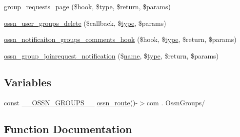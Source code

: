 \begin{DoxyCompactItemize}
\item 
\hyperlink{_ossn_groups_2ossn__com_8php_ac0c5dae50c34e8983844c5779765d01e}{group\+\_\+requests\+\_\+page} (\$hook, \$\hyperlink{_ossn_wall_2actions_2wall_2post_2group_8php_a2dc1bb4e1ed0029daa81ac0776b14b51}{type}, \$return, \$params)
\item 
\hyperlink{_ossn_groups_2ossn__com_8php_abc8417def2dbfd2f8b85b74e3cd0b870}{ossn\+\_\+user\+\_\+groups\+\_\+delete} (\$callback, \$\hyperlink{_ossn_wall_2actions_2wall_2post_2group_8php_a2dc1bb4e1ed0029daa81ac0776b14b51}{type}, \$params)
\item 
\hyperlink{_ossn_groups_2ossn__com_8php_a1c16014a0a01bc68f7287b31c44fdbc5}{ossn\+\_\+notificaiton\+\_\+groups\+\_\+comments\+\_\+hook} (\$hook, \$\hyperlink{_ossn_wall_2actions_2wall_2post_2group_8php_a2dc1bb4e1ed0029daa81ac0776b14b51}{type}, \$return, \$params)
\item 
\hyperlink{_ossn_groups_2ossn__com_8php_ad2d64e08e1c1c9cddd12eb27b33421c3}{ossn\+\_\+group\+\_\+joinrequest\+\_\+notification} (\$\hyperlink{user_8php_a765af5e9671743530143a6d3670fd9a6}{name}, \$\hyperlink{_ossn_wall_2actions_2wall_2post_2group_8php_a2dc1bb4e1ed0029daa81ac0776b14b51}{type}, \$return, \$params)
\end{DoxyCompactItemize}
\subsection*{Variables}
\begin{DoxyCompactItemize}
\item 
const \hyperlink{_ossn_groups_2ossn__com_8php_a32aa93b417a8d7de882c37988be02010}{\+\_\+\+\_\+\+O\+S\+S\+N\+\_\+\+G\+R\+O\+U\+P\+S\+\_\+\+\_\+} \hyperlink{ossn_8lib_8route_8php_ac23dc424aa33dcd57982b72f4ed1217e}{ossn\+\_\+route}()-\/$>$com . \textquotesingle{}Ossn\+Groups/\textquotesingle{}
\end{DoxyCompactItemize}


\subsection{Function Documentation}
